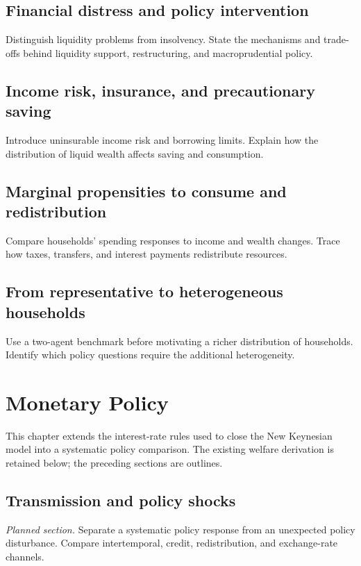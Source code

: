 \subsection{Financial distress and policy intervention}
Distinguish liquidity problems from insolvency. State the mechanisms and
trade-offs behind liquidity support, restructuring, and macroprudential policy.

\clearpage
{}\label{sec:heterogeneity}

\subsection{Income risk, insurance, and precautionary saving}
Introduce uninsurable income risk and borrowing limits. Explain how the
distribution of liquid wealth affects saving and consumption.

\subsection{Marginal propensities to consume and redistribution}
Compare households' spending responses to income and wealth changes.
Trace how taxes, transfers, and interest payments redistribute resources.

\subsection{From representative to heterogeneous households}
Use a two-agent benchmark before motivating a richer distribution of households.
Identify which policy questions require the additional heterogeneity.

\clearpage
\section{Monetary Policy}\label{sec:monetary-policy}

This chapter extends the interest-rate rules used to close the New Keynesian
model into a systematic policy comparison. The existing welfare derivation is
retained below; the preceding sections are outlines.

\subsection[Transmission and policy shocks (planned)]{Transmission and policy shocks}
\textit{Planned section.} Separate a systematic policy response from an unexpected policy disturbance.
Compare intertemporal, credit, redistribution, and exchange-rate channels.

